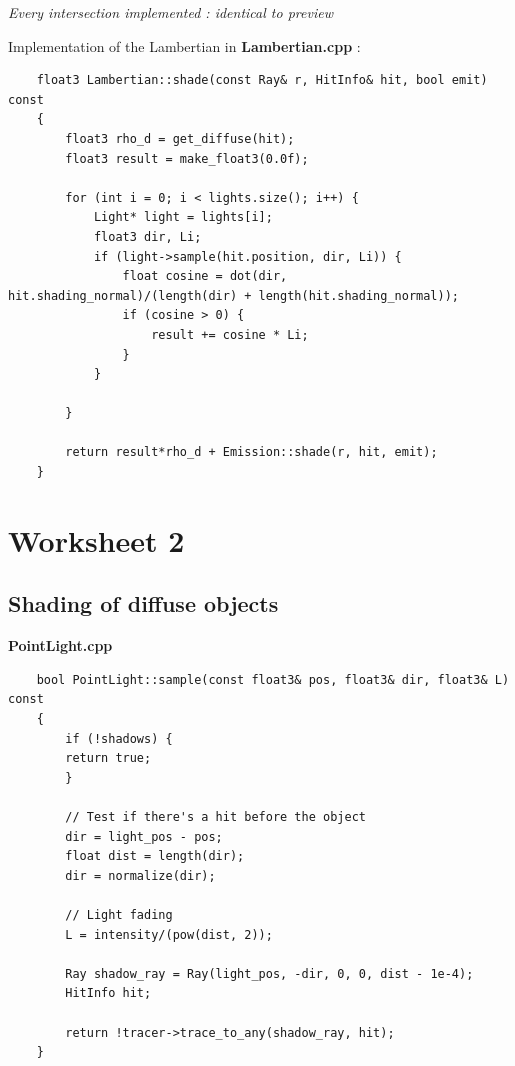 \documentclass[a4,12pt]{article}
\begin{document}
\begin{center}
\begin{minipage}[b]{0.40\linewidth}
\begin{center}
			\textit{Every intersection implemented : identical to preview}
		\end{center}
	\end{minipage}
	\end{center}

	Implementation of the Lambertian in \textbf{Lambertian.cpp} :
	\begin{lstlisting}
	float3 Lambertian::shade(const Ray& r, HitInfo& hit, bool emit) const
	{
		float3 rho_d = get_diffuse(hit);
		float3 result = make_float3(0.0f);
		
		for (int i = 0; i < lights.size(); i++) {
			Light* light = lights[i];
			float3 dir, Li;
			if (light->sample(hit.position, dir, Li)) {
				float cosine = dot(dir, hit.shading_normal)/(length(dir) + length(hit.shading_normal));
				if (cosine > 0) {
					result += cosine * Li;
				}
			}
			
		}
		
		return result*rho_d + Emission::shade(r, hit, emit);
	}
	\end{lstlisting}
	
	\section{Worksheet 2}
	
	\subsection{Shading of diffuse objects}
	\textbf{PointLight.cpp}
	\begin{lstlisting}
	bool PointLight::sample(const float3& pos, float3& dir, float3& L) const
	{
		if (!shadows) {
		return true;
		}
		
		// Test if there's a hit before the object
		dir = light_pos - pos;
		float dist = length(dir);
		dir = normalize(dir);
		
		// Light fading
		L = intensity/(pow(dist, 2));
		
		Ray shadow_ray = Ray(light_pos, -dir, 0, 0, dist - 1e-4);
		HitInfo hit;
		
		return !tracer->trace_to_any(shadow_ray, hit);
	}
	\end{lstlisting}
	
\end{document}
